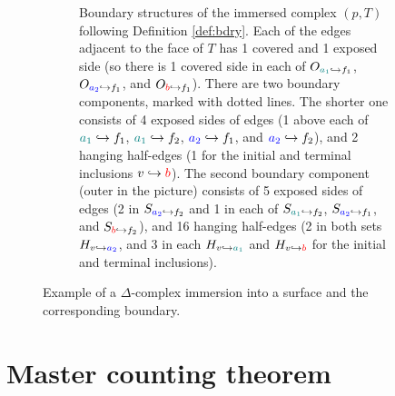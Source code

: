\documentclass{amsart}
\begin{document}
\begin{figure}[h]
\begin{subfigure}{\textwidth}
\caption{Boundary structures of the immersed complex $(p,T)$ following Definition \ref{def:bdry}. Each of the edges adjacent to the face of $T$ has 1 covered and 1 exposed side (so there is 1 covered side in each of $O_{{\color{teal}a_1}\hookrightarrow f_1}$, $O_{{\color{blue}a_2}\hookrightarrow f_1}$, and $O_{{\color{red}b}\hookrightarrow f_1}$). There are two boundary components, marked with dotted lines. The shorter one consists of 4 exposed sides of edges (1 above each of ${\color{teal}a_1}\hookrightarrow f_1$, ${\color{teal}a_1}\hookrightarrow f_2$, ${\color{blue}a_2}\hookrightarrow f_1$, and ${\color{blue}a_2}\hookrightarrow f_2$), and 2 hanging half-edges (1 for the initial and terminal inclusions $v\hookrightarrow{\color{red}b}$). The second boundary component (outer in the picture) consists of 5 exposed sides of edges (2 in $S_{{\color{blue}a_2}\hookrightarrow f_2}$ and 1 in each of $S_{{\color{teal}a_1}\hookrightarrow f_2}$, $S_{{\color{blue}a_2}\hookrightarrow f_1}$, and $S_{{\color{red}b}\hookrightarrow f_2}$), and 16 hanging half-edges (2 in both sets $H_{v\hookrightarrow{\color{blue}a_2}}$, and 3 in each $H_{v\hookrightarrow{\color{teal}a_1}}$ and $H_{v\hookrightarrow{\color{red}b}}$ for the initial and terminal inclusions).}
\label{sfig:bdry}
\end{subfigure}
\caption{Example of a $\Delta$-complex immersion into a surface and the corresponding boundary.}
\label{fig:immersion}
\end{figure}

\section{Master counting theorem}\label{sec:main_combi}
\end{document}
